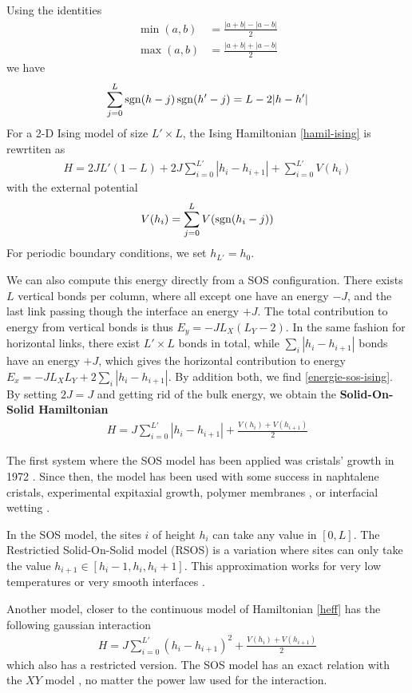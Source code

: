 {Using the identities
\begin{align}
     \min(a,b) &= \frac{|a+b| - |a-b|}{2} \\
    \max(a,b) &=    \frac{|a+b| + |a-b|}{2}
\end{align}
we have
\begin{align}
    \sum_{j=0}^L \operatorname{sgn}(h-j)\operatorname{sgn}(h'-j) = L - 2 |h-h'|
\end{align}
For a 2-D Ising model of size $L'\times L$, the Ising Hamiltonian \eqref{hamil-ising} is rewrtiten as
\begin{align}
    H = 2 J L' (1-L) +2 J \sum_{i=0}^{L'} |h_i-h_{i+1}| + \sum_{i=0}^{L'} V(h_i)
    \label{energie-sos-ising}
\end{align}
with the external potential 
\begin{align}
    V(h_i) = \sum_{j=0}^L V(\operatorname{sgn}(h_i-j))
\end{align}
For periodic boundary conditions, we set $h_{L'}=h_0$.

We can also compute this energy directly from a SOS configuration. There exists $L$ vertical bonds per column, where all except one have an energy $-J$, and the last link passing though the interface an energy $+J$. The total contribution to energy from vertical bonds is thus $E_y = - J L_X ( L_Y-2)$. In the same fashion for horizontal links, there exist $L' \times L$ bonds in total, while $\sum_i |h_i-h_{i+1}|$ bonds have an energy $+J$, which gives the horizontal contribution to energy $E_x = - J L_X L_Y + 2 \sum_i |h_i-h_{i+1}|$. By addition both, we find  \eqref{energie-sos-ising}.
By setting $2J=J$ and getting rid of the bulk energy, we obtain the \textbf{Solid-On-Solid Hamiltonian} 
\begin{align}
    H = J \sum_{i=0}^{L'} |h_i-h_{i+1}| + \frac{V(h_i)+V(h_{i+1})}{2}
    \label{hamil-sos}
\end{align}
}


{\color{blue}
The first system where the SOS model has been applied was cristals' growth in 1972 \cite{gilmer_simulation_1972}. Since then, the model has been used with some success in naphtalene cristals\cite{elwenspoek_kinetic_1987}, experimental expitaxial growth\cite{wilby_scaling_1992}, polymer membranes \cite{gompper_steric_1989}, or interfacial wetting \cite{fisher_walks_1983}.

In the SOS model, the sites $i$ of height $h_i$ can take any value in $[0,L]$. The Restrictied Solid-On-Solid model (RSOS) is a variation where sites can only take the value $h_{i+1} \in [h_i-1,h_i,h_i+1]$\cite{privman_transfer-matrix_1989}. This approximation works for very low temperatures or very smooth interfaces \cite{kim_conserved_1994,vaysburd_critical_1995}. 

Another model, closer to the continuous model of Hamiltonian \eqref{heff} has the following gaussian interaction
\begin{align}
    H = J \sum_{i=0}^{L'} (h_i-h_{i+1})^2 + \frac{V(h_i)+V(h_{i+1})}{2}
    \label{hamil-gsos}
\end{align}
which also has a restricted version. The SOS model has an exact relation with the $XY$ model \cite{knops_exact_1977}, no matter the power law used for the interaction.
}

